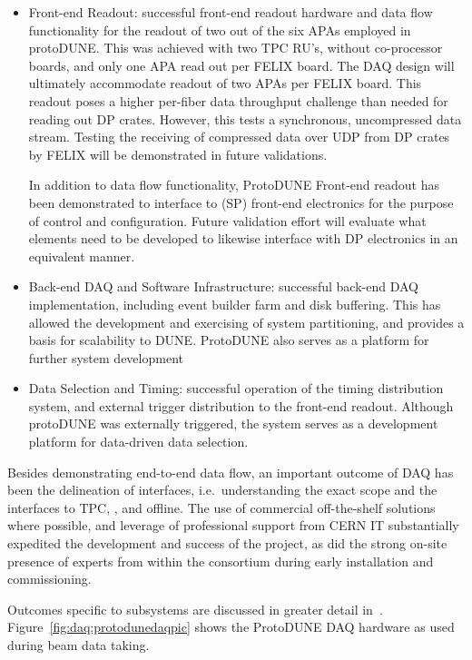 \begin{itemize}
\item Front-end Readout: successful front-end readout hardware and data
  flow functionality for the readout of two out of the six APAs employed
  in protoDUNE.
  This was achieved with two TPC RU's, without co-processor boards, and
  only one APA read out per FELIX board.
  The  DAQ design will ultimately accommodate readout of two
  APAs per FELIX board.
  This readout poses a higher per-fiber data throughput challenge than
  needed for reading out DP crates. 
  However, this tests a synchronous, uncompressed data stream. 
  Testing the receiving of compressed data over UDP from DP crates by
  FELIX will be demonstrated in future validations.

  In addition to data flow functionality, ProtoDUNE Front-end readout
  has been demonstrated to interface to (SP) front-end electronics for
  the purpose of control and configuration. 
  Future validation effort will evaluate what elements need to be
  developed to likewise interface with DP electronics in an equivalent
  manner.

\item Back-end DAQ and Software Infrastructure: successful back-end
  DAQ implementation, including event builder farm and disk buffering.
  This has allowed the development and exercising of system
  partitioning, and provides a basis for scalability to DUNE.
  ProtoDUNE also serves as a platform for further system development

\item Data Selection and Timing: successful operation of the timing
  distribution system, and external trigger distribution to the
  front-end readout.
  Although protoDUNE was externally triggered, the system serves as a
  development platform for data-driven data selection.
\end{itemize}

Besides demonstrating end-to-end data flow, an important outcome of
 DAQ has been the delineation of interfaces, i.e.~understanding
the exact  scope and the interfaces to TPC, , and
offline.
The use of commercial off-the-shelf solutions where possible, and
leverage of professional support from CERN IT substantially expedited
the development and success of the project, as did the strong on-site
presence of experts from within the consortium during early installation
and commissioning. 

Outcomes specific to  subsystems are discussed in
greater detail
in~\cite{talkfromCDR}. Figure~\ref{fig:daq:protodunedaqpic} shows the
ProtoDUNE DAQ hardware as used during beam data taking.

